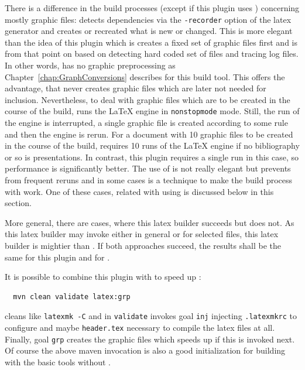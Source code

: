 There is a difference in the build processes 
(except if this plugin uses ) 
concerning mostly graphic files: 
 detects dependencies 
via the \texttt{-recorder} option of the latex generator 
and creates or recreated what is new or changed. 
This is more elegant than the idea of this plugin 
which is creates a fixed set of graphic files first 
and is from that point on 
based on detecting hard coded set of files and tracing log files. 
In other words,  has no graphic preprocessing 
as Chapter~\ref{chap:GraphConversions} describes for this build tool. 
This offers the advantage, that  never creates graphic files 
which are later not needed for inclusion. 
Nevertheless, 
to deal with graphic files which are to be created in the course of the build, 
 runs the \LaTeX{} engine in \texttt{nonstopmode} mode. 
Still, the run of the engine is interrupted, 
a single graphic file is created according to some rule 
and then the engine is rerun. 
For a document with 10 graphic files to be created in the course of the build, 
 requires 10 runs of the \LaTeX{} engine 
if no bibliography or so is presentations. 
In contrast, this plugin requires a single run in this case, 
so performance is significantly better. 
The use of  is not really elegant 
but prevents  from frequent reruns 
and in some cases is a technique 
to make the build process with  work. 
One of these cases, 
related with using  is discussed below in this section. 

More general, there are cases, 
where this latex builder succeeds but  does not. 
As this latex builder may invoke  
either in general or for selected files, 
this latex builder is mightier than . 
If both approaches succeed, 
the results shall be the same for this plugin and for . 

It is possible to combine this plugin with  
to speed up : 
%
\begin{Verbatim}
  mvn clean validate latex:grp
\end{Verbatim}
%
cleans like \texttt{latexmk -C} and in \texttt{validate} 
invokes goal \texttt{inj} injecting \texttt{.latexmkrc} to configure  
and maybe \texttt{header.tex} necessary to compile the latex files at all. 
Finally, goal \texttt{grp} creates the graphic files 
which speeds up  if this is invoked next. 
Of course the above maven invocation is also a good initialization 
for building with the basic tools without . 

